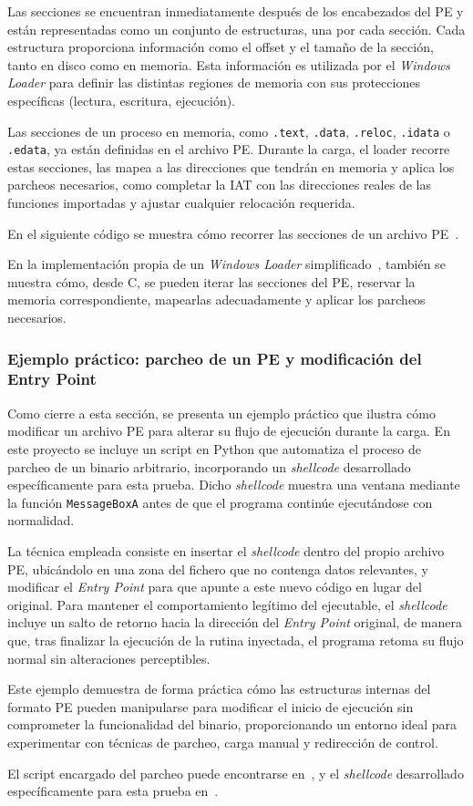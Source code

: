 Las secciones se encuentran inmediatamente después de los encabezados del PE y están representadas como un conjunto de estructuras, una por cada sección.  
Cada estructura proporciona información como el offset y el tamaño de la sección, tanto en disco como en memoria. Esta información es utilizada por el \textit{Windows Loader} para definir las distintas regiones de memoria con sus protecciones específicas (lectura, escritura, ejecución).

Las secciones de un proceso en memoria, como \texttt{.text}, \texttt{.data}, \texttt{.reloc}, \texttt{.idata} o \texttt{.edata}, ya están definidas en el archivo PE.  
Durante la carga, el loader recorre estas secciones, las mapea a las direcciones que tendrán en memoria y aplica los parcheos necesarios, como completar la IAT con las direcciones reales de las funciones importadas y ajustar cualquier relocación requerida.

En el siguiente código se muestra cómo recorrer las secciones de un archivo PE~\cite{walking_PE_headers}.

En la implementación propia de un \textit{Windows Loader} simplificado~\cite{walkingloader}, también se muestra cómo, desde C, se pueden iterar las secciones del PE, reservar la memoria correspondiente, mapearlas adecuadamente y aplicar los parcheos necesarios.


\subsubsection{Ejemplo práctico: parcheo de un PE y modificación del Entry Point}

Como cierre a esta sección, se presenta un ejemplo práctico que ilustra cómo modificar un archivo PE para alterar su flujo de ejecución durante la carga. En este proyecto se incluye un script en Python que automatiza el proceso de parcheo de un binario arbitrario, incorporando un \textit{shellcode} desarrollado específicamente para esta prueba. Dicho \textit{shellcode} muestra una ventana mediante la función \texttt{MessageBoxA} antes de que el programa continúe ejecutándose con normalidad.

La técnica empleada consiste en insertar el \textit{shellcode} dentro del propio archivo PE, ubicándolo en una zona del fichero que no contenga datos relevantes, y modificar el \textit{Entry Point} para que apunte a este nuevo código en lugar del original. Para mantener el comportamiento legítimo del ejecutable, el \textit{shellcode} incluye un salto de retorno hacia la dirección del \textit{Entry Point} original, de manera que, tras finalizar la ejecución de la rutina inyectada, el programa retoma su flujo normal sin alteraciones perceptibles.

Este ejemplo demuestra de forma práctica cómo las estructuras internas del formato PE pueden manipularse para modificar el inicio de ejecución sin comprometer la funcionalidad del binario, proporcionando un entorno ideal para experimentar con técnicas de parcheo, carga manual y redirección de control.

El script encargado del parcheo puede encontrarse en~\cite{binary_patching_entrypoint},
y el \textit{shellcode} desarrollado específicamente para esta prueba en~\cite{messagebox_patch_shellcode}.
